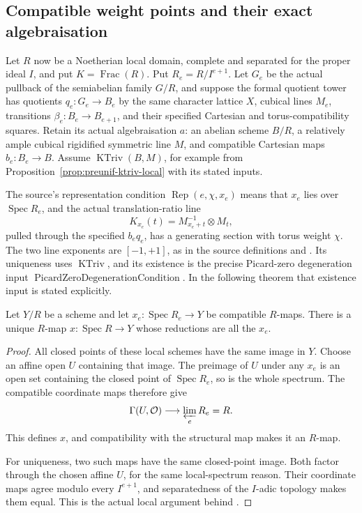 \subsection{Compatible weight points and their exact algebraisation}
Let \(R\) now be a Noetherian local domain, complete and separated
for the proper ideal \(I\), and put \(K=\operatorname{Frac}(R)\).  Put \(R_e=R/I^{e+1}\).
Let \(G_e\) be the actual pullback of the semiabelian family \(G/R\),
and suppose the formal quotient tower has quotients
\(q_e:G_e\to B_e\) by the same character lattice \(X\), cubical lines
\(M_e\), transitions \(\beta_e:B_e\to B_{e+1}\), and their specified
Cartesian and torus-compatibility squares.
Retain its actual algebraisation \(a\): an abelian scheme \(B/R\),
a relatively ample cubical rigidified symmetric line \(M\), and
compatible Cartesian maps \(b_e:B_e\to B\).
Assume \(\operatorname{KTriv}(B,M)\), for example from
Proposition~\ref{prop:preunif-ktriv-local} with its stated inputs.

The source's representation condition
\(\operatorname{Rep}(e,\chi,x_e)\) means that \(x_e\) lies over
\(\operatorname{Spec}R_e\), and the actual translation-ratio line
\[
                  K_{x_e}(t)=M_{x_e+t}^{-1}\otimes M_t,
\]
pulled through the specified \(b_e q_e\), has a generating section
with torus weight \(\chi\). The two line exponents are
\([-1,+1]\), as in the source definitions
 and .  Its uniqueness uses
\(\operatorname{KTriv}\), and its existence is the precise
Picard-zero degeneration input
\(\operatorname{PicardZeroDegenerationCondition}\).
In the following theorem that existence input is stated explicitly.

\begin{srlemma}
\label{lem:preunif-adic-points}
Let \(Y/R\) be a scheme and let
\(x_e:\operatorname{Spec}R_e\to Y\) be compatible \(R\)-maps.
There is a unique \(R\)-map \(x:\operatorname{Spec}R\to Y\)
whose reductions are all the \(x_e\).
\end{srlemma}
\begin{proof}
All closed points of these local schemes have the same image in
\(Y\).  Choose an affine open \(U\) containing that image.
The preimage of \(U\) under any \(x_e\) is an open set containing
the closed point of \(\operatorname{Spec}R_e\), so is the whole
spectrum.  The compatible coordinate maps therefore give
\[
                \Gamma(U,\mathcal O)\longrightarrow
                  \varprojlim_e R_e=R.
\]
This defines \(x\), and compatibility with the structural map
makes it an \(R\)-map.

For uniqueness, two such maps have the same closed-point image.
Both factor through the chosen affine \(U\), for the same
local-spectrum reason.  Their coordinate maps agree modulo every
\(I^{e+1}\), and separatedness of the \(I\)-adic topology makes
them equal.  This is the actual local argument behind
.
\end{proof}

